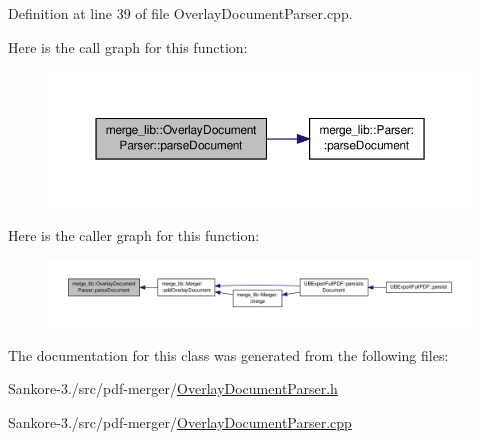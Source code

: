 Definition at line 39 of file Overlay\-Document\-Parser.\-cpp.



Here is the call graph for this function\-:
\nopagebreak
\begin{figure}[H]
\begin{center}
\leavevmode
\includegraphics[width=350pt]{d0/dd3/classmerge__lib_1_1_overlay_document_parser_a03f2f36e4e57c5c6cfb37933bc82c801_cgraph}
\end{center}
\end{figure}




Here is the caller graph for this function\-:
\nopagebreak
\begin{figure}[H]
\begin{center}
\leavevmode
\includegraphics[width=350pt]{d0/dd3/classmerge__lib_1_1_overlay_document_parser_a03f2f36e4e57c5c6cfb37933bc82c801_icgraph}
\end{center}
\end{figure}




The documentation for this class was generated from the following files\-:\begin{DoxyCompactItemize}
\item 
Sankore-\/3./src/pdf-\/merger/\hyperlink{_overlay_document_parser_8h}{Overlay\-Document\-Parser.\-h}\item 
Sankore-\/3./src/pdf-\/merger/\hyperlink{_overlay_document_parser_8cpp}{Overlay\-Document\-Parser.\-cpp}\end{DoxyCompactItemize}
